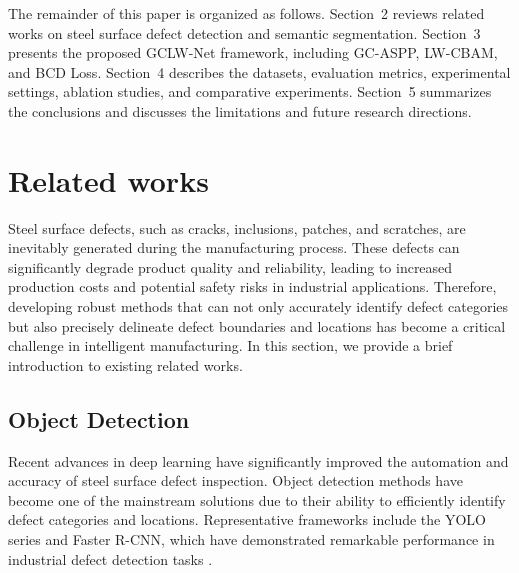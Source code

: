\documentclass[sn-basic]{sn-jnl}
\theoremstyle{thmstyleone}%
\theoremstyle{thmstyletwo}%
\theoremstyle{thmstylethree}%
\begin{document}
The remainder of this paper is organized as follows. Section~2 reviews related works on steel surface defect detection and semantic segmentation. Section~3 presents the proposed GCLW-Net framework, including GC-ASPP, LW-CBAM, and BCD Loss. Section~4 describes the datasets, evaluation metrics, experimental settings, ablation studies, and comparative experiments. Section~5 summarizes the conclusions and discusses the limitations and future research directions.


\section{Related works}
Steel surface defects, such as cracks, inclusions, patches, and scratches, are inevitably generated during the manufacturing process. These defects can significantly degrade product quality and reliability, leading to increased production costs and potential safety risks in industrial applications. Therefore, developing robust methods that can not only accurately identify defect categories but also precisely delineate defect boundaries and locations has become a critical challenge in intelligent manufacturing. In this section, we provide a brief introduction to existing related works.
\subsection{Object Detection}
Recent advances in deep learning have significantly improved the automation and accuracy of steel surface defect inspection. Object detection methods have become one of the mainstream solutions due to their ability to efficiently identify defect categories and locations. Representative frameworks include the YOLO series and Faster R-CNN, which have demonstrated remarkable performance in industrial defect detection tasks \cite{Jiang2022Review,Terven2023Comprehensive,Tian2025Faster}.
\end{document}
